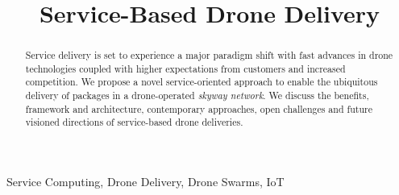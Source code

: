 \documentclass[conference]{IEEEtran}
\begin{document}
\title{Service-Based Drone Delivery\\}

\author{

\and
{}

\and
{}

}

\maketitle

\begin{abstract}
Service delivery is set to experience a major paradigm shift with fast advances in drone technologies coupled with higher expectations from customers and increased competition. We propose a novel service-oriented approach to enable the ubiquitous delivery of packages in a drone-operated \textit{skyway network}. We discuss the benefits, framework and architecture, contemporary approaches, open challenges and future visioned directions of service-based drone deliveries.
\end{abstract}

\begin{IEEEkeywords}
Service Computing, Drone Delivery, Drone Swarms, IoT
\end{IEEEkeywords}
\end{document}
